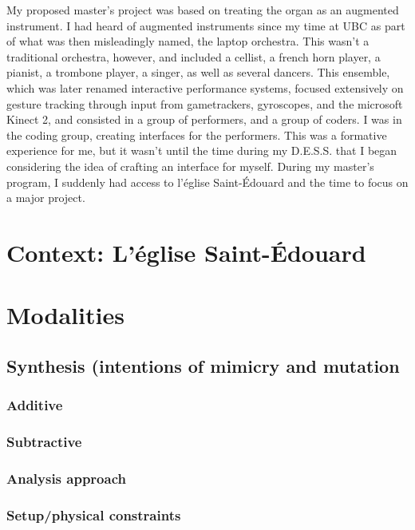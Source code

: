 \documentclass[12pt,twoside,maitrise]{dms}
\theoremstyle{definition}
\begin{document}
My proposed master’s project was based on treating the organ as an augmented instrument.
I had heard of augmented instruments since my time at UBC as part of what was then misleadingly named, the laptop orchestra.
This wasn’t a traditional orchestra, however, and included a cellist, a french horn player, a pianist, a trombone player, a singer, as well as several dancers.
This ensemble, which was later renamed interactive performance systems, focused extensively on gesture tracking through input from gametrackers, gyroscopes, and the microsoft Kinect 2, and consisted in a group of performers, and a group of coders.
I was in the coding group, creating interfaces for the performers.
This was a formative experience for me, but it wasn’t until the time during my D.E.S.S.
that I began considering the idea of crafting an interface for myself.
During my master’s program, I suddenly had access to l’église Saint-Édouard and the time to focus on a major project.

\section{Context: L'église Saint-Édouard}

\section{Modalities}

\subsection{Synthesis (intentions of mimicry and mutation}

\subsubsection{Additive}

\subsubsection{Subtractive}

\subsubsection{Analysis approach}

\subsubsection{Setup/physical constraints}
\end{document}
